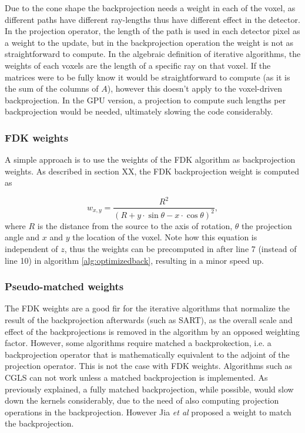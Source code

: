 Due to the cone shape the backprojection needs a weight in each of the voxel, as different paths have different ray-lengths thus have different effect in the detector. In the projection operator, the length of the path is used in each detector pixel as a weight to the update, but in the backprojection operation the weight is not as straightforward to compute. In the algebraic definition of iterative algorithms, the weights of each voxels are the length of a specific ray on that voxel. If the matrices were to be fully know it would be straightforward to compute (as it is the sum of the columns of $A$), however this doesn't apply to the voxel-driven backprojection. In the GPU version, a projection to compute such lengths per backprojection would be needed, ultimately slowing the code considerably.

\subsubsection*{FDK weights}
A simple approach is to use the weights of the FDK algorithm as backprojection weights. As described in section XX, the FDK backprojection weight is computed as

\begin{equation}
w_{x,y}=\frac{R^2}{(R+y\cdot \sin\theta-x\cdot\cos\theta)^2},
\end{equation}
where $R$ is the distance from the source to the axis of rotation, $\theta$ the projection angle and $x$ and $y$ the location of the voxel. Note how this equation is independent of $z$, thus the weights can be precomputed in after line 7 (instead of line 10) in algorithm \ref{alg:optimizedback}, resulting in a minor speed up.


\subsubsection*{Pseudo-matched weights}
The FDK weights are a good fir for the iterative algorithms that normalize the result of the backprojection afterwards (such as SART), as the overall scale and effect of the backprojections is removed in the algorithm by an opposed weighting factor. However, some algorithms require matched a backprokection, i.e. a backprojection operator that is mathematically equivalent to the adjoint of the projection operator. This is not the case with FDK weights. Algorithms such as CGLS can not work unless a matched backprojection is implemented. As previously explained, a fully matched backprojection, while possible, would slow down the kernels considerably, due to the need of also computing projection operations in the backprojection. However Jia \textit{et al}\cite{jia2011gpu} proposed a weight to match the backprojection.

